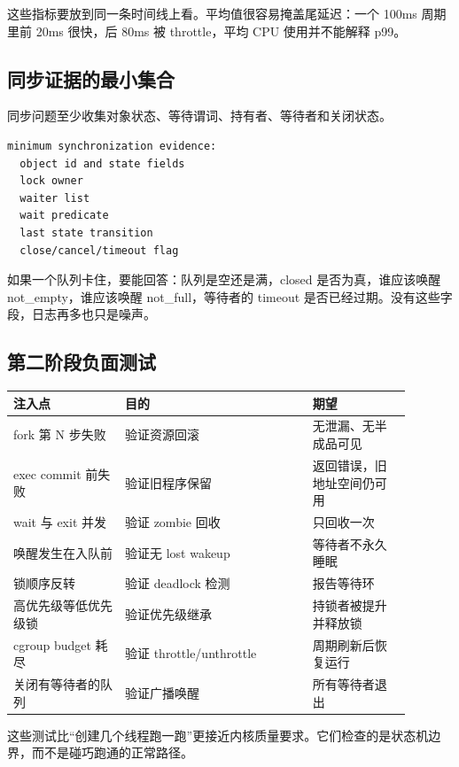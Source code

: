 这些指标要放到同一条时间线上看。平均值很容易掩盖尾延迟：一个 100ms 周期里前 20ms 很快，后 80ms 被 throttle，平均 CPU 使用并不能解释 p99。

\subsection{同步证据的最小集合}

同步问题至少收集对象状态、等待谓词、持有者、等待者和关闭状态。

\begin{lstlisting}
minimum synchronization evidence:
  object id and state fields
  lock owner
  waiter list
  wait predicate
  last state transition
  close/cancel/timeout flag
\end{lstlisting}

如果一个队列卡住，要能回答：队列是空还是满，closed 是否为真，谁应该唤醒 not\_empty，谁应该唤醒 not\_full，等待者的 timeout 是否已经过期。没有这些字段，日志再多也只是噪声。

\subsection{第二阶段负面测试}

\begin{longtable}{|p{0.25\linewidth}|p{0.42\linewidth}|p{0.22\linewidth}|}
\toprule
注入点 & 目的 & 期望 \\
\midrule
fork 第 N 步失败 & 验证资源回滚 & 无泄漏、无半成品可见 \\\tablerowrule
exec commit 前失败 & 验证旧程序保留 & 返回错误，旧地址空间仍可用 \\\tablerowrule
wait 与 exit 并发 & 验证 zombie 回收 & 只回收一次 \\\tablerowrule
唤醒发生在入队前 & 验证无 lost wakeup & 等待者不永久睡眠 \\\tablerowrule
锁顺序反转 & 验证 deadlock 检测 & 报告等待环 \\\tablerowrule
高优先级等低优先级锁 & 验证优先级继承 & 持锁者被提升并释放锁 \\\tablerowrule
cgroup budget 耗尽 & 验证 throttle/unthrottle & 周期刷新后恢复运行 \\\tablerowrule
关闭有等待者的队列 & 验证广播唤醒 & 所有等待者退出 \\
\bottomrule
\end{longtable}

这些测试比“创建几个线程跑一跑”更接近内核质量要求。它们检查的是状态机边界，而不是碰巧跑通的正常路径。

